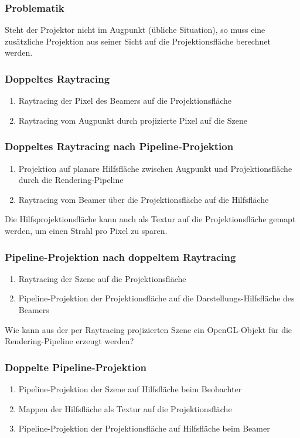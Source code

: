 \documentclass[a4paper, 12pt]{article}
\begin{document}
\subsubsection*{Problematik}
Steht der Projektor nicht im Augpunkt (übliche Situation), so muss eine zusätzliche Projektion aus seiner Sicht auf die Projektionsfläche berechnet werden.

\subsubsection*{Doppeltes Raytracing}
\begin{enumerate}
  \item Raytracing der Pixel des Beamers auf die Projektionsfläche
  \item Raytracing vom Augpunkt durch projizierte Pixel auf die Szene
\end{enumerate}

\subsubsection*{Doppeltes Raytracing nach Pipeline-Projektion}
\begin{enumerate}
  \item Projektion auf planare Hilfsfläche zwischen Augpunkt und Projektionsfläche durch die Rendering-Pipeline
  \item Raytracing vom Beamer über die Projektionsfläche auf die Hilfsfläche
\end{enumerate}
Die Hilfsprojektionsfläche kann auch als Textur auf die Projektionsfläche gemapt werden, um einen Strahl pro Pixel zu sparen.

\subsubsection*{Pipeline-Projektion nach doppeltem Raytracing}
\begin{enumerate}
  \item Raytracing der Szene auf die Projektionsfläche
  \item Pipeline-Projektion der Projektionsfläche auf die Darstellungs-Hilfsfläche des Beamers
\end{enumerate}
Wie kann aus der per Raytracing projizierten Szene ein OpenGL-Objekt für die Rendering-Pipeline erzeugt werden?

\subsubsection*{Doppelte Pipeline-Projektion}
\begin{enumerate}
  \item Pipeline-Projektion der Szene auf Hilfsfläche beim Beobachter
  \item Mappen der Hilfsfläche als Textur auf die Projektionsfläche
  \item Pipeline-Projektion der Projektionsfläche auf Hilfsfläche beim Beamer
\end{enumerate}
\end{document}
